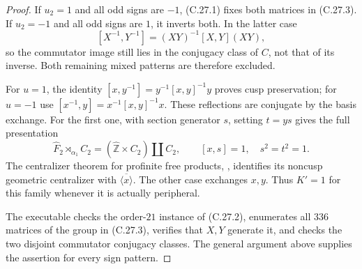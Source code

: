 \begin{proof}
If $u_2=1$ and all odd signs are $-1$, (C.27.1) fixes
both matrices in (C.27.3).  If $u_2=-1$ and all odd
signs are $1$, it inverts both.  In the latter case
\[
 [X^{-1},Y^{-1}]=(XY)^{-1}[X,Y](XY),
\]
so the commutator image still lies in the conjugacy
class of $C$, not that of its inverse.  Both remaining
mixed patterns are therefore excluded.

For $u=1$, the identity
$[x,y^{-1}]=y^{-1}[x,y]^{-1}y$ proves cusp preservation;
for $u=-1$ use
$[x^{-1},y]=x^{-1}[x,y]^{-1}x$.
These reflections are conjugate by the basis exchange.
For the first one, with section generator $s$, setting
$t=ys$ gives the full presentation
\[
 \widehat F_2\rtimes_{\alpha_1} C_2
       =(\widehat{\mathbb Z}\times C_2)\amalg C_2,
 \qquad [x,s]=1,\quad s^2=t^2=1.
\]
The centralizer theorem for profinite free products,
\cite[Theorem B']{A_HR1985}, identifies its noncusp
geometric centralizer with $\overline{\langle x\rangle}$.
The other case exchanges $x,y$.  Thus $K'=1$ for
this family whenever it is actually peripheral.

The executable 
checks the order-$21$ instance of (C.27.2), enumerates
all $336$ matrices of the group in (C.27.3), verifies
that $X,Y$ generate it, and checks the two disjoint
commutator conjugacy classes.  The general argument
above supplies the assertion for every sign pattern.
\end{proof}
